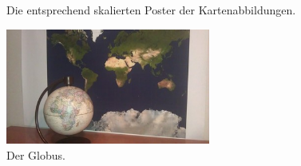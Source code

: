 \documentclass[a4paper,12pt]{article}
\begin{document}
\begin{figure}[!hb]
\begin{center}

\caption{Die entsprechend skalierten Poster der Kartenabbildungen.}
\end{center}
\end{figure}

\begin{figure}[ht]
\begin{center}
\includegraphics[width=0.6\textwidth]{../common/globe.jpg}
\caption{Der Globus.}
\label{fig-globus}
\end{center}
\end{figure}
\end{document}

